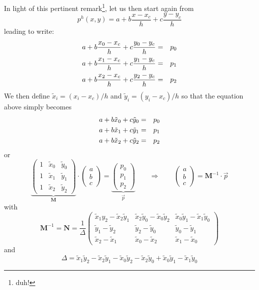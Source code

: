 In light of this pertinent remark\footnote{duh!}, let us then start again from 
\[
p^h(x,y) = a+b\frac{x-x_c}{h}+c \frac{y-y_c}{h}
\]
leading to write:
\begin{eqnarray}
a + b \frac{x_0-x_c}{h} + c\frac{y_0-y_c}{h} &=& p_0 \nonumber\\
a + b \frac{x_1-x_c}{h} + c\frac{y_1-y_c}{h} &=& p_1 \nonumber\\
a + b \frac{x_2-x_c}{h} + c\frac{y_2-y_c}{h} &=& p_2 \nonumber
\end{eqnarray}
We then define $\tilde{x}_i=(x_i-x_c)/h$ and $\tilde{y}_i=(y_i-x_c)/h$ so that 
the equation above simply becomes
\begin{eqnarray}
a + b\tilde{x}_0 + c\tilde{y}_0 &=& p_0 \nonumber\\
a + b\tilde{x}_1 + c\tilde{y}_1 &=& p_1 \nonumber\\
a + b\tilde{x}_2 + c\tilde{y}_2 &=& p_2 \nonumber
\end{eqnarray}
or
\[
\underbrace{
\left(\begin{array}{ccc}
1 & \tilde{x}_0 & \tilde{y}_0 \\
1 & \tilde{x}_1 & \tilde{y}_1 \\
1 & \tilde{x}_2 & \tilde{y}_2 
\end{array}\right)
}_{{\bm M}}
\cdot 
\left(\begin{array}{ccc}
a \\ b \\ c
\end{array}\right)
=
\underbrace{
\left(\begin{array}{ccc}
p_0 \\ p_1 \\ p_2
\end{array}\right)
}_{\vec{p}}
\qquad
\Rightarrow
\qquad
\left(\begin{array}{ccc}
a \\ b \\ c
\end{array}\right)
=
{\bm M}^{-1} \cdot \vec{p}
\]
with
\[
{\bm M}^{-1} 
= {\bm N} 
= \frac{1}{\Delta}
\left(
\begin{array}{ccc}
\tilde{x}_1y_2-\tilde{x}_2\tilde{y}_1 
& \tilde{x}_2\tilde{y}_0-\tilde{x}_0\tilde{y}_2 
& \tilde{x}_0\tilde{y}_1-\tilde{x}_1\tilde{y}_0 \\
\tilde{y}_1-\tilde{y}_2 & \tilde{y}_2-\tilde{y}_0 & \tilde{y}_0-\tilde{y}_1 \\
\tilde{x}_2-\tilde{x}_1 & \tilde{x}_0-\tilde{x}_2 & \tilde{x}_1-\tilde{x}_0
\end{array}
\right)
\]
and
\[
\Delta 
= \tilde{x}_1\tilde{y}_2-\tilde{x}_2\tilde{y}_1 
- \tilde{x}_0\tilde{y}_2-\tilde{x}_2\tilde{y}_0 
+ \tilde{x}_0\tilde{y}_1-\tilde{x}_1\tilde{y}_0
\]
